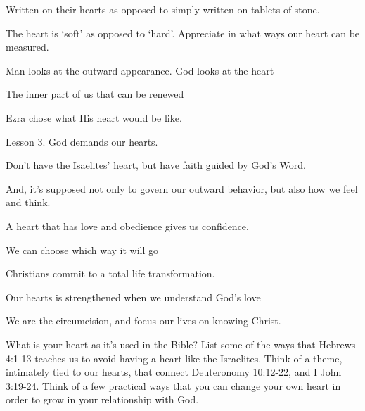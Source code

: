 \begin{discussion}

Written on their hearts as opposed to simply written on tablets of stone.

The heart is `soft' as opposed to `hard'.  Appreciate in what ways our heart can be measured.


 Man looks at the outward appearance.  God looks at the heart

 The inner part of us that can be renewed

 Ezra chose what His heart would be like.

 Lesson 3.  God demands our hearts.


 Don't have the Isaelites' heart, but have faith guided by God's Word.

And, it's supposed not only to govern our outward behavior, but also how we feel and think.

 A heart that has love and obedience gives us confidence.\\


 We can choose which way it will go

 Christians commit to a total life transformation.

 Our hearts is strengthened when we understand God's love

 We are the circumcision, and focus our lives on knowing Christ.

\end{discussion}

\begin{questions}
\q What is your heart as it's used in the Bible?
\q List some of the ways that Hebrews 4:1-13 teaches us to avoid having a heart like the Israelites.
\q Think of a theme, intimately tied to our hearts, that connect Deuteronomy 10:12-22, and I John 3:19-24.
\q Think of a few practical ways that you can change your own heart in order to grow in your relationship with God.
\end{questions}